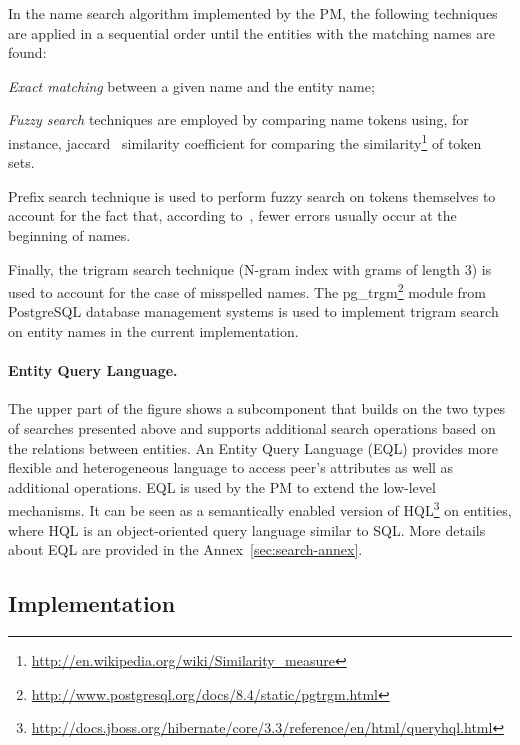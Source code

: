 In the name search algorithm implemented by the PM, the following techniques are applied in a sequential order until the entities with the matching names are found:
\begin{inparaenum}[(i)]
\item \emph{Exact matching} between a given name and the entity name; 
\item \emph{Fuzzy search} techniques are employed by comparing name tokens using, for instance, jaccard~\cite{Bilenko:2003pd} similarity coefficient for comparing the similarity\footnote{\url{http://en.wikipedia.org/wiki/Similarity_measure}} of token sets.
\item Prefix search technique is used to perform fuzzy search on tokens themselves to account for the fact that, according to~\cite{Pollock:1984rr}, fewer errors usually occur at the beginning of names. 
\item Finally, the trigram search technique (N-gram index with grams of length 3) is used to account for the case of misspelled names. The pg\_trgm\footnote{\url{http://www.postgresql.org/docs/8.4/static/pgtrgm.html}}  module from PostgreSQL database management systems is used to implement trigram search on entity names in the current implementation. 
\end{inparaenum}


\paragraph{Entity Query Language.} 
\label{par:entity_query_language}
The upper part of the figure shows a subcomponent that builds on the two types of searches presented above and supports additional search operations based on the relations between entities. An Entity Query Language (EQL) provides more flexible and heterogeneous language to access peer’s attributes as well as additional operations. 
EQL is used by the PM to extend the low-level mechanisms. It can be seen as a semantically enabled version of HQL\footnote{\url{http://docs.jboss.org/hibernate/core/3.3/reference/en/html/queryhql.html}} on entities, where HQL is an object-oriented query language similar to SQL. More details about EQL are provided in the Annex~\ref{sec:search-annex}.


\subsection{Implementation}

